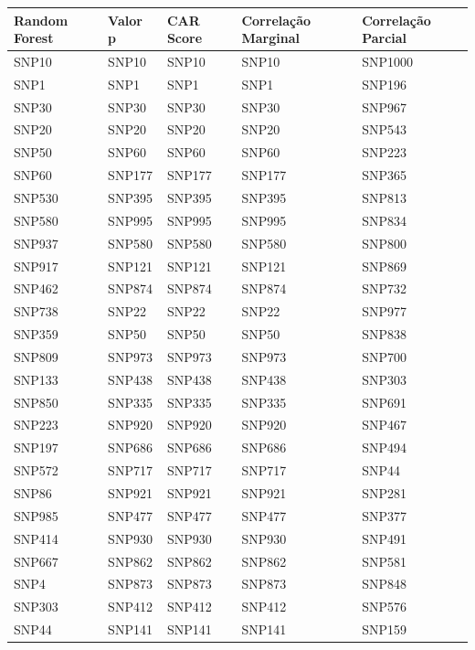 \begin{table}[ht]
\centering
\begin{tabular}{lllll}
  \hline
Random Forest & Valor p & CAR Score & Correlação Marginal & Correlação Parcial \\ 
  \hline
SNP10 & SNP10 & SNP10 & SNP10 & SNP1000 \\ 
  SNP1 & SNP1 & SNP1 & SNP1 & SNP196 \\ 
  SNP30 & SNP30 & SNP30 & SNP30 & SNP967 \\ 
  SNP20 & SNP20 & SNP20 & SNP20 & SNP543 \\ 
  SNP50 & SNP60 & SNP60 & SNP60 & SNP223 \\ 
  SNP60 & SNP177 & SNP177 & SNP177 & SNP365 \\ 
  SNP530 & SNP395 & SNP395 & SNP395 & SNP813 \\ 
  SNP580 & SNP995 & SNP995 & SNP995 & SNP834 \\ 
  SNP937 & SNP580 & SNP580 & SNP580 & SNP800 \\ 
  SNP917 & SNP121 & SNP121 & SNP121 & SNP869 \\ 
  SNP462 & SNP874 & SNP874 & SNP874 & SNP732 \\ 
  SNP738 & SNP22 & SNP22 & SNP22 & SNP977 \\ 
  SNP359 & SNP50 & SNP50 & SNP50 & SNP838 \\ 
  SNP809 & SNP973 & SNP973 & SNP973 & SNP700 \\ 
  SNP133 & SNP438 & SNP438 & SNP438 & SNP303 \\ 
  SNP850 & SNP335 & SNP335 & SNP335 & SNP691 \\ 
  SNP223 & SNP920 & SNP920 & SNP920 & SNP467 \\ 
  SNP197 & SNP686 & SNP686 & SNP686 & SNP494 \\ 
  SNP572 & SNP717 & SNP717 & SNP717 & SNP44 \\ 
  SNP86 & SNP921 & SNP921 & SNP921 & SNP281 \\ 
  SNP985 & SNP477 & SNP477 & SNP477 & SNP377 \\ 
  SNP414 & SNP930 & SNP930 & SNP930 & SNP491 \\ 
  SNP667 & SNP862 & SNP862 & SNP862 & SNP581 \\ 
  SNP4 & SNP873 & SNP873 & SNP873 & SNP848 \\ 
  SNP303 & SNP412 & SNP412 & SNP412 & SNP576 \\ 
  SNP44 & SNP141 & SNP141 & SNP141 & SNP159 \\ 

\end{tabular}
\end{table}
